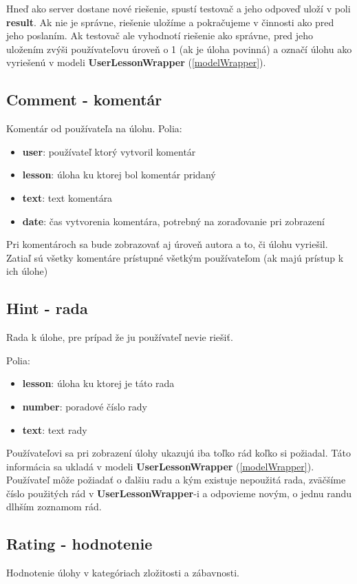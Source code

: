 Hneď ako server dostane nové riešenie, spustí testovač a jeho odpoveď uloží v poli
\textbf{result}. Ak nie je správne, riešenie uložíme a pokračujeme v činnosti ako pred jeho poslaním.
Ak testovač ale vyhodnotí riešenie ako správne, pred jeho uložením zvýši používateľovu
úroveň o 1 (ak je úloha povinná) a označí úlohu ako vyriešenú v modeli \textbf{UserLessonWrapper} (\ref{modelWrapper}).

\subsection{Comment - komentár}
Komentár od používateľa na úlohu.
Polia:
\begin{itemize}
\item \textbf{user}: používateľ ktorý vytvoril komentár
\item \textbf{lesson}: úloha ku ktorej bol komentár pridaný
\item \textbf{text}: text komentára
\item \textbf{date}: čas vytvorenia komentára, potrebný na zoraďovanie pri zobrazení
\end{itemize}

Pri komentároch sa bude zobrazovať aj úroveň autora a to, či úlohu vyriešil.
Zatiaľ sú všetky komentáre prístupné všetkým používateľom (ak majú prístup k ich úlohe)


\subsection{Hint - rada}
Rada k úlohe, pre prípad že ju používateľ nevie riešiť.

Polia:
\begin{itemize}
\item \textbf{lesson}: úloha ku ktorej je táto rada
\item \textbf{number}: poradové číslo rady
\item \textbf{text}: text rady
\end{itemize}

Používateľovi sa pri zobrazení úlohy ukazujú iba toľko rád koľko si požiadal. Táto
informácia sa ukladá v modeli \textbf{UserLessonWrapper} (\ref{modelWrapper}).
Používateľ môže požiadať o ďalšiu radu a kým existuje nepoužitá rada, zväčšíme
číslo použitých rád v \textbf{UserLessonWrapper}-i a odpovieme novým, o jednu randu dlhším zoznamom rád.

\subsection{Rating - hodnotenie}
Hodnotenie úlohy v kategóriach zložitosti a zábavnosti.


